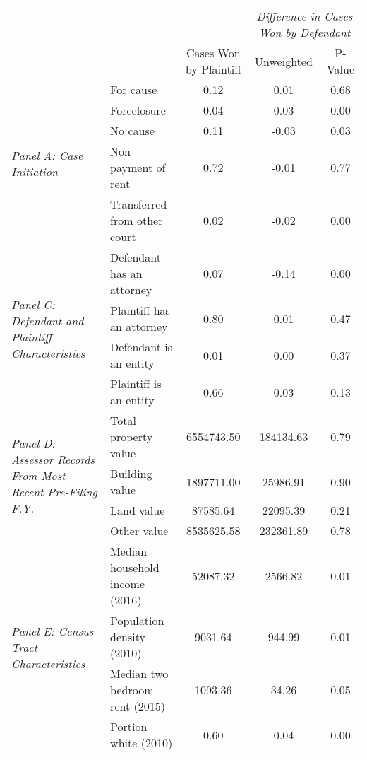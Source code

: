 \begin{tabular}{llccc}
\toprule
 &  & \textit{} & \multicolumn{2}{|c|}{\textit{Difference in Cases Won by Defendant}} \\
 &  & Cases Won by Plaintiff & Unweighted & P-Value \\
\midrule
\multirow[c]{5}{4cm}{\textit{Panel A: Case Initiation}} & For cause & 0.12 & 0.01 & 0.68 \\
 & Foreclosure & 0.04 & 0.03 & 0.00 \\
 & No cause & 0.11 & -0.03 & 0.03 \\
 & Non-payment of rent & 0.72 & -0.01 & 0.77 \\
 & Transferred from other court & 0.02 & -0.02 & 0.00 \\
\cline{1-5}
\multirow[c]{4}{4cm}{\textit{Panel C: Defendant and Plaintiff Characteristics}} & Defendant has an attorney & 0.07 & -0.14 & 0.00 \\
 & Plaintiff has an attorney & 0.80 & 0.01 & 0.47 \\
 & Defendant is an entity & 0.01 & 0.00 & 0.37 \\
 & Plaintiff is an entity & 0.66 & 0.03 & 0.13 \\
\cline{1-5}
\multirow[c]{4}{4cm}{\textit{Panel D: Assessor Records From Most Recent Pre-Filing F.Y.}} & Total property value & 6554743.50 & 184134.63 & 0.79 \\
 & Building value & 1897711.00 & 25986.91 & 0.90 \\
 & Land value & 87585.64 & 22095.39 & 0.21 \\
 & Other value & 8535625.58 & 232361.89 & 0.78 \\
\cline{1-5}
\multirow[c]{4}{4cm}{\textit{Panel E: Census Tract Characteristics}} & Median household income (2016) & 52087.32 & 2566.82 & 0.01 \\
 & Population density (2010) & 9031.64 & 944.99 & 0.01 \\
 & Median two bedroom rent (2015) & 1093.36 & 34.26 & 0.05 \\
 & Portion white (2010) & 0.60 & 0.04 & 0.00 \\
\cline{1-5}
\bottomrule
\end{tabular}
